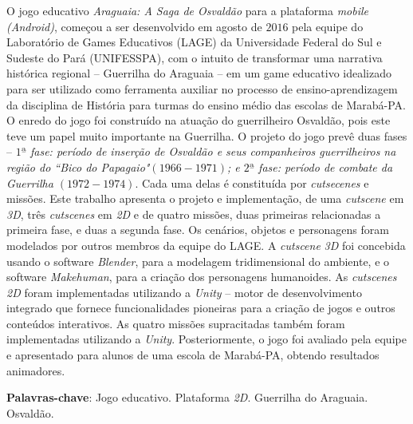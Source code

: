 %
%

\begin{RESUMO}
	\begin{SingleSpace}
		
	\hspace{-1.5cm}O jogo  educativo \textit{Araguaia: A Saga de Osvaldão} para a plataforma \textit{mobile (Android)}, começou a ser desenvolvido em agosto de $2016$ pela equipe do Laboratório de Games Educativos (LAGE) da Universidade Federal do Sul e Sudeste do Pará (UNIFESSPA), com o intuito de transformar uma narrativa histórica regional -- Guerrilha do Araguaia -- em um game educativo idealizado para ser utilizado como ferramenta auxiliar no processo de ensino-aprendizagem da disciplina de História para turmas do ensino médio das escolas de Marabá-PA. O enredo do jogo foi construído na atuação do guerrilheiro Osvaldão, pois este teve um papel muito importante na Guerrilha. O projeto do jogo prevê duas fases -- \textit{$1ª$ fase: período de inserção de Osvaldão e seus companheiros guerrilheiros na região do ``Bico do Papagaio"\space $(1966-1971)$; e $2ª$ fase: período de combate da Guerrilha $(1972-1974)$}. Cada uma delas é constituída por \textit{cutsecenes} e missões. Este trabalho apresenta o projeto e implementação, de uma \textit{cutscene} em \textit{3D}, três \textit{cutscenes} em \textit{2D} e de quatro missões, duas primeiras relacionadas a primeira fase, e duas a segunda fase. Os cenários, objetos e personagens foram modelados por outros membros da equipe do LAGE. A \textit{cutscene} \textit{3D} foi concebida usando o software \textit{Blender}, para a modelagem tridimensional do ambiente, e o software \textit{Makehuman}, para a criação dos personagens humanoides. As \textit{cutscenes 2D} foram implementadas utilizando a \textit{Unity} -- motor de desenvolvimento integrado que fornece funcionalidades pioneiras para a criação de jogos e outros conteúdos interativos. As quatro missões supracitadas também foram implementadas utilizando a \textit{Unity}. Posteriormente, o jogo foi avaliado pela equipe e apresentado para alunos de uma escola de Marabá-PA, obtendo resultados animadores.
	
	\vspace*{0.5cm}\hspace{-1.5 cm}\textbf{Palavras-chave}: Jogo educativo. Plataforma \textit{2D}. Guerrilha do Araguaia. Osvaldão.
	
	\end{SingleSpace}
\end{RESUMO}